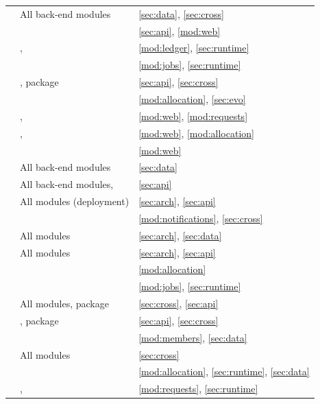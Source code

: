 {\begin{longtable}{@{}L{4.6cm}L{\dimexpr\textwidth-4.6cm-3.2cm-4\tabcolsep\relax}L{3.2cm}@{}}
 & All back-end modules & \ref{sec:data}, \ref{sec:cross} \\
 &  & \ref{sec:api}, \ref{mod:web} \\
 & ,  & \ref{mod:ledger}, \ref{sec:runtime} \\
 &  & \ref{mod:jobs}, \ref{sec:runtime} \\
 & ,  package & \ref{sec:api}, \ref{sec:cross} \\
 &  & \ref{mod:allocation}, \ref{sec:evo} \\
 & ,  & \ref{mod:web}, \ref{mod:requests} \\
 & ,  & \ref{mod:web}, \ref{mod:allocation} \\
 &  & \ref{mod:web} \\
 & All back-end modules & \ref{sec:data} \\
 & All back-end modules,  & \ref{sec:api} \\
 & All modules (deployment) & \ref{sec:arch}, \ref{sec:api} \\
 &  & \ref{mod:notifications}, \ref{sec:cross} \\
 & All modules & \ref{sec:arch}, \ref{sec:data} \\
 & All modules & \ref{sec:arch}, \ref{sec:api} \\
 &  & \ref{mod:allocation} \\
 &  & \ref{mod:jobs}, \ref{sec:runtime} \\
 & All modules,  package & \ref{sec:cross}, \ref{sec:api} \\
 & ,  package & \ref{sec:api}, \ref{sec:cross} \\
 &  & \ref{mod:members}, \ref{sec:data} \\
 & All modules & \ref{sec:cross} \\
 &  & \ref{mod:allocation}, \ref{sec:runtime}, \ref{sec:data} \\
 & ,  & \ref{mod:requests}, \ref{sec:runtime} \\

\end{longtable}}
